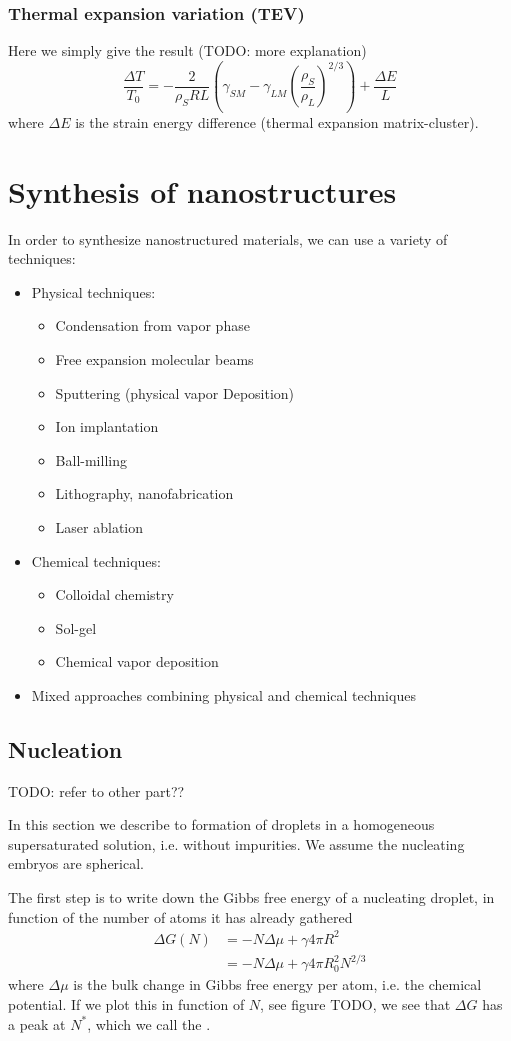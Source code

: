 \subsection{Thermal expansion variation (TEV)}
Here we simply give the result (TODO: more explanation)
\[ \frac{\Delta T}{T_0} = - \frac{2}{\rho_S RL}\left(\gamma_{SM} - \gamma_{LM}\left(\frac{\rho_S}{\rho_L}\right)^{2/3}\right) + \frac{\Delta E}{L} \]
where $\Delta E$ is the strain energy difference (thermal expansion matrix-cluster).

\chapter{Synthesis of nanostructures}
In order to synthesize nanostructured materials, we can use a variety of techniques:
\begin{itemize}
\item Physical techniques:
\begin{itemize}
\item Condensation from vapor phase
\item Free expansion molecular beams
\item Sputtering (physical vapor Deposition)
\item Ion implantation
\item Ball-milling
\item Lithography, nanofabrication
\item Laser ablation
\end{itemize}
\item Chemical techniques:
\begin{itemize}
\item Colloidal chemistry
\item Sol-gel
\item Chemical vapor deposition
\end{itemize}
\item Mixed approaches combining physical and chemical techniques
\end{itemize}

\section{Nucleation}
TODO: refer to other part??

In this section we describe to formation of droplets in a homogeneous supersaturated solution, i.e. without impurities. We assume the nucleating embryos are spherical.

The first step is to write down the Gibbs free energy of a nucleating droplet, in function of the number of atoms it has already gathered
\begin{align*}
\Delta G(N) &= - N \Delta \mu + \gamma 4\pi R^2 \\
&= - N \Delta \mu + \gamma 4\pi R_0^2 N^{2/3} 
\end{align*}
where $\Delta \mu$ is the bulk change in Gibbs free energy per atom, i.e. the chemical potential.
If we plot this in function of $N$, see figure TODO, we see that $\Delta G$ has a peak at $N^*$, which we call the .

